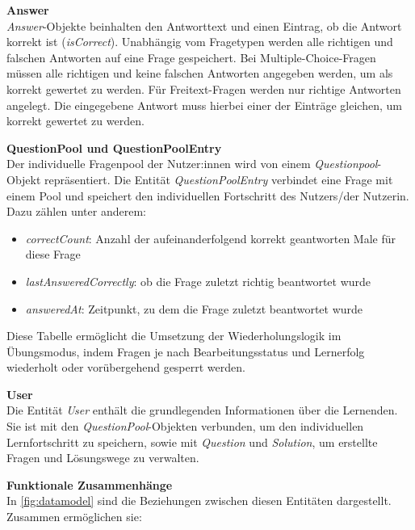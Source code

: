 \vspace{0.2cm}
\textbf{Answer} \\
\textit{Answer}-Objekte beinhalten den Antworttext und einen Eintrag, ob die Antwort korrekt ist (\textit{isCorrect}). 
Unabhängig vom Fragetypen werden alle richtigen und falschen Antworten auf eine Frage gespeichert. Bei Multiple-Choice-Fragen 
müssen alle richtigen und keine falschen Antworten angegeben werden, um als korrekt gewertet zu werden. Für Freitext-Fragen 
werden nur richtige Antworten angelegt. Die eingegebene Antwort muss hierbei einer der Einträge gleichen, um korrekt gewertet
zu werden.

\vspace{0.2cm}
\textbf{QuestionPool und QuestionPoolEntry} \\
Der individuelle Fragenpool der Nutzer:innen wird von einem \textit{Questionpool}-Objekt repräsentiert. Die Entität 
\textit{QuestionPoolEntry} verbindet eine Frage mit einem Pool und speichert den individuellen Fortschritt des Nutzers/der Nutzerin. 
Dazu zählen unter anderem:

\begin{itemize}
  \item \textit{correctCount}: Anzahl der aufeinanderfolgend korrekt geantworten Male für diese Frage
  \item \textit{lastAnsweredCorrectly}: ob die Frage zuletzt richtig beantwortet wurde
  \item \textit{answeredAt}: Zeitpunkt, zu dem die Frage zuletzt beantwortet wurde
\end{itemize}

Diese Tabelle ermöglicht die Umsetzung der Wiederholungslogik im Übungsmodus, indem Fragen je nach Bearbeitungsstatus 
und Lernerfolg wiederholt oder vorübergehend gesperrt werden.

\vspace{0.2cm}
\textbf{User} \\
Die Entität \textit{User} enthält die grundlegenden Informationen über die Lernenden. Sie ist mit den \textit{QuestionPool}-Objekten 
verbunden, um den individuellen Lernfortschritt zu speichern, sowie mit \textit{Question} und \textit{Solution}, um erstellte Fragen und 
Lösungswege zu verwalten.

\vspace{0.2cm}
\textbf{Funktionale Zusammenhänge} \\
In \autoref{fig:datamodel} sind die Beziehungen zwischen diesen Entitäten dargestellt. Zusammen ermöglichen sie:

